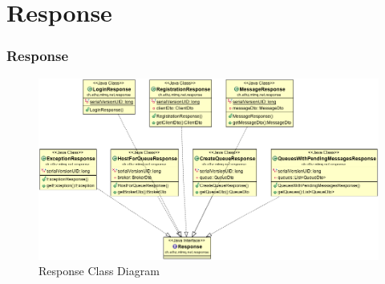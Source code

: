 \documentclass{beamer}
\begin{document}

\section{Response}
\begin{frame}
\frametitle{Response}

\begin{figure}
  \begin{center}
    \includegraphics[scale=0.33]{../../class_diagrams/Response.png}
  \end{center}
  \caption{Response Class Diagram}
  \label{fig:db-schema}
\end{figure}

\end{frame}

\end{document}
